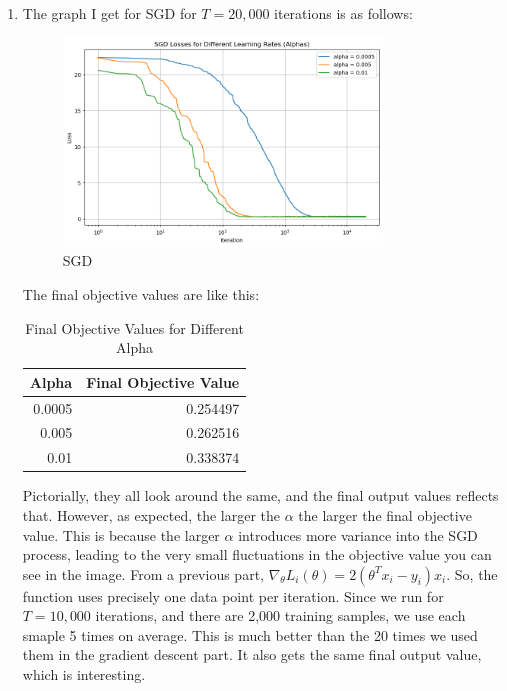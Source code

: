 \documentclass[12pt]{article}
\theoremstyle{definitionstyle}
\begin{document}
\begin{enumerate}[leftmargin=\labelsep]
\begin{enumerate}[label=(\alph*)]
            \item The graph I get for SGD for $T = 20,000$ iterations is as follows:
            \begin{figure}[H]
                \centering
                \includegraphics[width=0.8\textwidth]{sgd_output.png}
                \caption{SGD}
                \label{fig:sgd}
            \end{figure}
            The final objective values are like this:
            \begin{table}[H]
                \centering
                \caption{Final Objective Values for Different Alpha}
                \label{tab:final_objective_values}
                \begin{tabular}{rr}
                \toprule
                 Alpha &  Final Objective Value \\
                \midrule
                0.0005 &               0.254497 \\
                0.005 &               0.262516 \\
                0.01 &               0.338374 \\
                \bottomrule
                \end{tabular}
            \end{table}
            Pictorially, they all look around the same, and the final output values reflects that. However, as expected, the larger the $\alpha$ the larger the final objective value. This is because the larger $\alpha$ introduces more variance into the SGD process, leading to the very small fluctuations in the objective value you can see in the image. From a previous part, $\nabla_\theta L_i(\theta) = 2(\theta^T x_i - y_i)x_i$. So, the function uses precisely one data point per iteration. Since we run for $T = 10,000$ iterations, and there are 2,000 training samples, we use each smaple 5 times on average. This is much better than the 20 times we used them in the gradient descent part. It also gets the same final output value, which is interesting.


\end{enumerate}
\end{enumerate}
\end{document}

